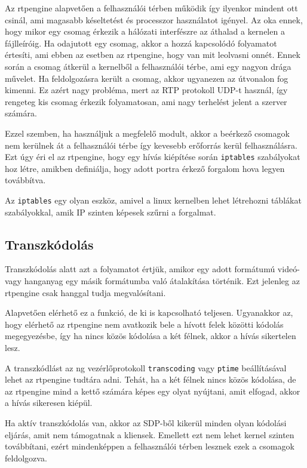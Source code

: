 Az rtpengine alapvetően a felhasználói térben működik így ilyenkor mindent ott csinál, ami
magasabb késeltetést és processzor használatot igényel. Az oka ennek, hogy mikor egy 
csomag érkezik a hálózati interfészre az áthalad a kernelen a fájlleíróig. Ha odajutott 
egy csomag, akkor a hozzá kapcsolódó folyamatot értesíti, ami ebben az esetben az 
rtpengine, hogy van mit leolvasni onnét. Ennek során a csomag átkerül a kernelből a 
felhasználói térbe, ami egy nagyon drága művelet. Ha feldolgozásra került a csomag, 
akkor ugyanezen az útvonalon fog kimenni. Ez azért nagy probléma, mert az RTP protokoll 
UDP-t használ, így rengeteg kis csomag érkezik folyamatosan, ami nagy terhelést jelent 
a szerver számára. 

Ezzel szemben, ha használjuk a megfelelő modult, akkor a beérkező csomagok nem kerülnek 
át a felhasználói térbe így kevesebb erőforrás kerül felhasználásra. Ezt úgy éri el az 
rtpengine, hogy egy hívás kiépítése során \texttt{iptables} szabályokat hoz létre, 
amikben definiálja, hogy adott portra érkező forgalom hova legyen továbbítva. 

Az \texttt{iptables} egy olyan eszköz, amivel a linux kernelben lehet létrehozni 
táblákat szabályokkal, amik IP szinten képesek szűrni a forgalmat. 

\subsection{Transzkódolás}

Transzkódolás alatt azt a folyamatot értjük, amikor egy adott formátumú videó- vagy 
hanganyag egy másik formátumba való átalakítása történik. Ezt jelenleg az rtpengine 
csak hanggal tudja megvalósítani. 

Alapvetően elérhető ez a funkció, de ki is kapcsolható teljesen. Ugyanakkor az, hogy 
elérhető az rtpengine nem avatkozik bele a hívott felek közötti kódolás megegyezésbe, 
így ha nincs közös kódolása a két félnek, akkor a hívás sikertelen lesz.

A transzkódlást az ng vezérlőprotokoll \texttt{transcoding} vagy \texttt{ptime} 
beállításával lehet az rtpengine tudtára adni. Tehát, ha a két félnek nincs közös 
kódolása, de az rtpengine mind a kettő számára képes egy olyat nyújtani, amit elfogad, 
akkor a hívás sikeresen kiépül.

Ha aktív transzkódolás van, akkor az SDP-ből kikerül minden olyan kódolási eljárás, amit 
nem támogatnak a kliensek. Emellett ezt nem lehet kernel szinten továbbítani, ezért 
mindenképpen a felhasználói térben lesznek ezek a csomagok feldolgozva.

